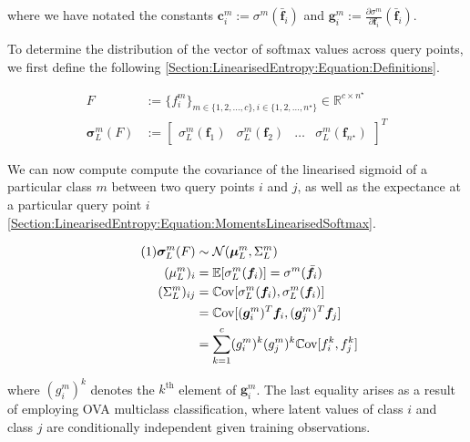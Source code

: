 \documentclass{article}
\renewcommand{\vec}[1]{\boldsymbol{#1}}
\newcommand\numberthis{\addtocounter{equation}{1}\tag{\theequation}}
\begin{document}
			where we have notated the constants $\vec{c}^{m}_{i} := \sigma^{m}(\bar{\vec{f}}_{i})$ and $\vec{g}^{m}_{i} := \frac{\partial \sigma^{m}}{\partial \vec{f}_{i}}(\bar{\vec{f}}_{i})$.
			
			To determine the distribution of the vector of softmax values across query points, we first define the following \eqref{Section:LinearisedEntropy:Equation:Definitions}.
			
			\begin{equation}
				\begin{aligned}
					F &:= \{f^{m}_{i}\}_{m \in \{1, 2, \dots, c\}, i \in \{1, 2, \dots, n^{\star}\}} \in \mathbb{R}^{c \times n^{\star}} \\
					\vec{\sigma}^{m}_{L}(F) &:= \begin{bmatrix} \sigma^{m}_{L}(\vec{f}_{1}) & \sigma^{m}_{L}(\vec{f}_{2}) & \dots & \sigma^{m}_{L}(\vec{f}_{n^{\star}}) \end{bmatrix}^{T}
				\end{aligned}
			\label{Section:LinearisedEntropy:Equation:Definitions}
			\end{equation}
						
			We can now compute compute the covariance of the linearised sigmoid of a particular class $m$ between two query points $i$ and $j$, as well as the expectance at a particular query point $i$ \eqref{Section:LinearisedEntropy:Equation:MomentsLinearisedSoftmax}.
			
			\begin{align*}
			\numberthis \label{Section:LinearisedEntropy:Equation:MomentsLinearisedSoftmax}
					\vec{\sigma}^{m}_{L}(F) & \sim \mathcal{N}(\vec{\mu}^{m}_{L}, \Sigma^{m}_{L}) \\
					(\mu^{m}_{L})_{i} & = \mathbb{E}[\sigma^{m}_{L}(\vec{f}_{i})] =  \sigma^{m}(\bar{\vec{f}}_{i}) \\
					(\Sigma^{m}_{L})_{ij} & = \mathbb{C}\mathrm{ov}[\sigma^{m}_{L}(\vec{f}_{i}), \sigma^{m}_{L}(\vec{f}_{i})] \\
					& = \mathbb{C}\mathrm{ov}[(\vec{g}^{m}_{i})^{T} \vec{f}_{i}, (\vec{g}^{m}_{j})^{T} \vec{f}_{j}] \\
					& = \sum_{k = 1}^{c} (g^{m}_{i})^{k} (g^{m}_{j})^{k} \mathbb{C}\mathrm{ov}[f^{k}_{i}, f^{k}_{j}]
			\end{align*}
						
			where $(g^{m}_{i})^{k}$ denotes the $k^{\text{th}}$ element of $\vec{g}^{m}_{i}$. The last equality arises as a result of employing OVA multiclass classification, where latent values of class $i$ and class $j$ are conditionally independent given training observations.
			
\end{document}
